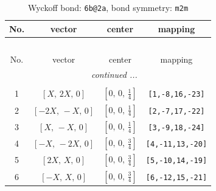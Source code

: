 \documentclass[fleqn,8pt]{jsarticle}
\begin{document}
\begin{longtable}{cccc}
\caption{Wyckoff bond: {\tt 6b@2a}, bond symmetry: {\tt m2m}}
 \\
 \hline \hline
No. & vector & center & mapping \\ \hline \endfirsthead

\multicolumn{3}{l}{\tablename\ \thetable{}} \\
 \hline \hline
No. & vector & center & mapping \\ \hline \endhead

 \hline \hline
\multicolumn{3}{r}{\footnotesize\it continued ...} \\ \endfoot

 \hline \hline
\multicolumn{3}{r}{} \\ \endlastfoot

1 & $\left[ X,\, 2 X,\, 0 \right]$ & $\left[ 0,\, 0,\, \frac{1}{4} \right]$ & {\tt [1,-8,16,-23]} \\ \hline
2 & $\left[ - 2 X,\, - X,\, 0 \right]$ & $\left[ 0,\, 0,\, \frac{1}{4} \right]$ & {\tt [2,-7,17,-22]} \\ \hline
3 & $\left[ X,\, - X,\, 0 \right]$ & $\left[ 0,\, 0,\, \frac{1}{4} \right]$ & {\tt [3,-9,18,-24]} \\ \hline
4 & $\left[ - X,\, - 2 X,\, 0 \right]$ & $\left[ 0,\, 0,\, \frac{3}{4} \right]$ & {\tt [4,-11,13,-20]} \\ \hline
5 & $\left[ 2 X,\, X,\, 0 \right]$ & $\left[ 0,\, 0,\, \frac{3}{4} \right]$ & {\tt [5,-10,14,-19]} \\ \hline
6 & $\left[ - X,\, X,\, 0 \right]$ & $\left[ 0,\, 0,\, \frac{3}{4} \right]$ & {\tt [6,-12,15,-21]} \\
\end{longtable}
\renewcommand{\arraystretch}{1.2}
\end{document}
